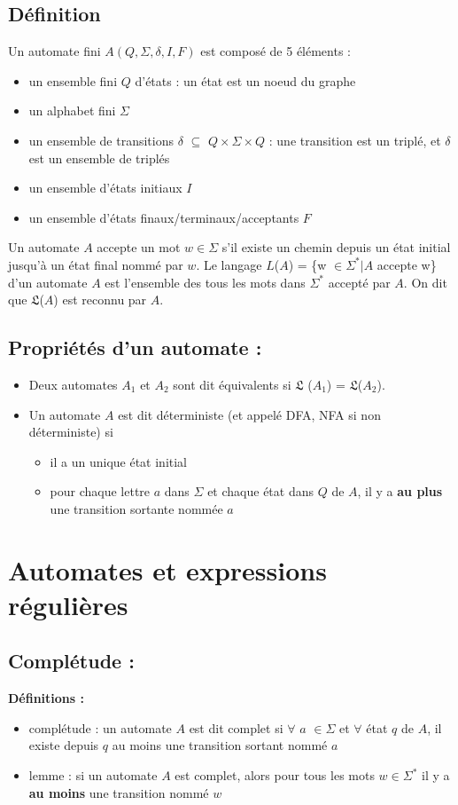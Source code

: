 \documentclass{article}
\begin{document}
\subsection{Définition}
Un automate fini $A(Q,\Sigma,\delta,I,F)$ est composé de 5 éléments :
\begin{itemize}
    \item un ensemble fini $Q$ d'états : un état est un noeud du graphe
    \item un alphabet fini $\Sigma$
    \item un ensemble de transitions $\delta$ $\subseteq$ $Q \times \Sigma \times Q$ : une transition est un triplé, et $\delta$ est un ensemble de triplés
    \item un ensemble d'états initiaux $I$
    \item un ensemble d'états finaux/terminaux/acceptants $F$
\end{itemize}
Un automate $A$ accepte un mot $w \in \Sigma$ s'il existe un chemin depuis un état initial jusqu'à un état final nommé par $w$.\newline
Le langage $L$($A$) = \{w $\in \Sigma^{*} | A$ accepte w\} d'un automate $A$ est l'ensemble des tous les mots dans $\Sigma^{*}$ accepté par $A$. On dit que $\mathfrak{L}$($A$) est reconnu par $A$.\newline

\subsection{Propriétés d'un automate :}
\begin{itemize}
    \item Deux automates $A_{1}$ et $A_{2}$ sont dit équivalents si $\mathfrak{L}$ ($A_{1}$) = $\mathfrak{L}$($A_{2}$).
    \item Un automate $A$ est dit déterministe (et appelé DFA, NFA si non déterministe) si
    \begin{itemize}
        \item il a un unique état initial
        \item pour chaque lettre $a$ dans $\Sigma$ et chaque état dans $Q$ de $A$, il y a \textbf{au plus} une transition sortante nommée $a$
    \end{itemize}
\end{itemize}
\newpage
\section{Automates et expressions régulières}
\subsection{Complétude :}
\textbf{Définitions :}
\begin{itemize}
    \item complétude : un automate $A$ est dit complet si $\forall$ $a$ $\in \Sigma$ et $\forall$ état $q$ de $A$, il existe depuis $q$ au moins une transition sortant nommé $a$
    \item lemme : si un automate $A$ est complet, alors pour tous les mots $w \in \Sigma^{*}$ il y a \textbf{au moins} une transition nommé $w$
\end{itemize}
\end{document}
